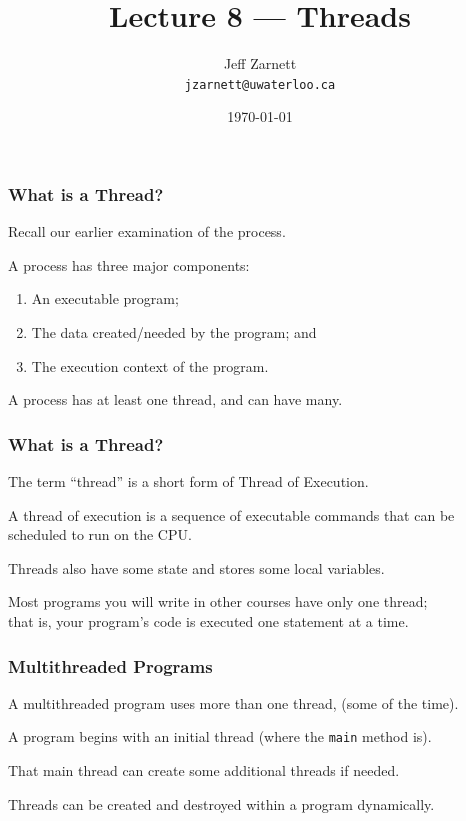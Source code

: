 

\title{Lecture 8 --- Threads}

\author{Jeff Zarnett \\ \small \texttt{jzarnett@uwaterloo.ca}}
\date{\today}




\begin{frame}
  \titlepage

 \end{frame}

\begin{frame}
\frametitle{What is a Thread?}


Recall our earlier examination of the process. 

A process has three major components: 
\begin{enumerate}
\item An executable program;
\item The data created/needed by the program; and 
\item The execution context of the program.
\end{enumerate}

A process has at least one \alert{thread}, and can have many.

\end{frame}

\begin{frame}
\frametitle{What is a Thread?}

The term ``thread'' is a short form of \alert{Thread of Execution}.

  A thread of execution is a sequence of executable commands that can be scheduled to run on the CPU. 
  
  Threads also have some state and stores some local variables.
  
  Most programs you will write in other courses have only one thread;\\
  \quad that is, your program's code is executed one statement at a time.

\end{frame}

\begin{frame}
\frametitle{Multithreaded Programs}

A multithreaded program uses more than one thread, (some of the time).

  A program begins with an initial thread (where the \texttt{main} method is).
  
That main thread can create some additional threads if needed.

 Threads can be created and destroyed within a program dynamically.

\end{frame}

